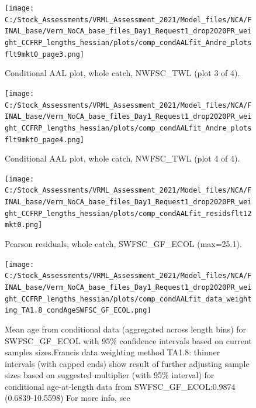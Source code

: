 \documentclass[11pt,
  english,
]{article}
\begin{document}
\begin{figure}
\centering
\texttt{[image: C:/Stock\_Assessments/VRML\_Assessment\_2021/Model\_files/NCA/FINAL\_base/Verm\_NoCA\_base\_files\_Day1\_Request1\_drop2020PR\_weight\_CCFRP\_lengths\_hessian/plots/comp\_condAALfit\_Andre\_plotsflt9mkt0\_page3.png]}
\caption{Conditional AAL plot, whole catch, NWFSC\_TWL (plot 3 of 4).\label{fig:comp_condAALfit_Andre_plotsflt9mkt0_page3}}
\end{figure}

\begin{figure}
\centering
\texttt{[image: C:/Stock\_Assessments/VRML\_Assessment\_2021/Model\_files/NCA/FINAL\_base/Verm\_NoCA\_base\_files\_Day1\_Request1\_drop2020PR\_weight\_CCFRP\_lengths\_hessian/plots/comp\_condAALfit\_Andre\_plotsflt9mkt0\_page4.png]}
\caption{Conditional AAL plot, whole catch, NWFSC\_TWL (plot 4 of 4).\label{fig:comp_condAALfit_Andre_plotsflt9mkt0_page4}}
\end{figure}

\begin{figure}
\centering
\texttt{[image: C:/Stock\_Assessments/VRML\_Assessment\_2021/Model\_files/NCA/FINAL\_base/Verm\_NoCA\_base\_files\_Day1\_Request1\_drop2020PR\_weight\_CCFRP\_lengths\_hessian/plots/comp\_condAALfit\_residsflt12mkt0.png]}
\caption{Pearson residuals, whole catch, SWFSC\_GF\_ECOL (max=25.1).\label{fig:comp_condAALfit_residsflt12mkt0}}
\end{figure}

\begin{figure}
\centering
\texttt{[image: C:/Stock\_Assessments/VRML\_Assessment\_2021/Model\_files/NCA/FINAL\_base/Verm\_NoCA\_base\_files\_Day1\_Request1\_drop2020PR\_weight\_CCFRP\_lengths\_hessian/plots/comp\_condAALfit\_data\_weighting\_TA1.8\_condAgeSWFSC\_GF\_ECOL.png]}
\caption{Mean age from conditional data (aggregated across length bins) for SWFSC\_GF\_ECOL with 95\% confidence intervals based on current samples sizes.Francis data weighting method TA1.8: thinner intervals (with capped ends) show result of further adjusting sample sizes based on suggested multiplier (with 95\% interval) for conditional age-at-length data from SWFSC\_GF\_ECOL:0.9874 (0.6839-10.5598) For more info, see}
\end{figure}
\end{document}
